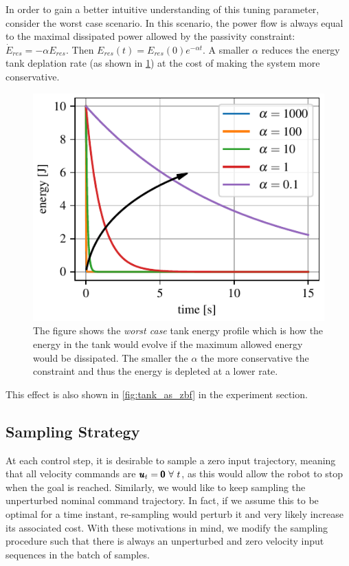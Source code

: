 In order to gain a better intuitive understanding of this tuning parameter, consider the worst case scenario. In this scenario, the power flow is always equal to the maximal dissipated power allowed by the passivity constraint: $\dot{E}_{res} = - \alpha E_{res}$. Then $E_{res}(t) = E_{res}(0) e^{-\alpha t}$. A smaller $\alpha$ reduces the energy tank deplation rate  (as shown in \fig \ref{fig:worst_case_energy_profile}) at the cost of making the system more conservative.
\begin{figure}[t]
    \centering
    \includegraphics[width=0.8\columnwidth]{figures/worst_case_energy_profile.pdf}
    \caption{The figure shows the \textit{worst case} tank energy profile which is how the energy in the tank would evolve if the maximum allowed energy would be dissipated. The smaller the $\alpha$ the more conservative the constraint and thus the energy is depleted at a lower rate.}
    \label{fig:worst_case_energy_profile}
\end{figure}
This effect is also shown in \fig \ref{fig:tank_as_zbf} in the experiment section.

\subsection{Sampling Strategy}
At each control step, it is desirable to sample a zero input trajectory, meaning that all velocity commands are $\pmb{u}_t = \pmb{0}\ \forall\ t$, as this would allow the robot to stop when the goal is reached. Similarly, we would like to keep sampling the unperturbed nominal command trajectory. In fact, if we assume this to be optimal for a time instant, re-sampling would perturb it and very likely increase its associated cost. With these motivations in mind, we modify the sampling procedure such that there is always an unperturbed and zero velocity input sequences in the batch of samples.

